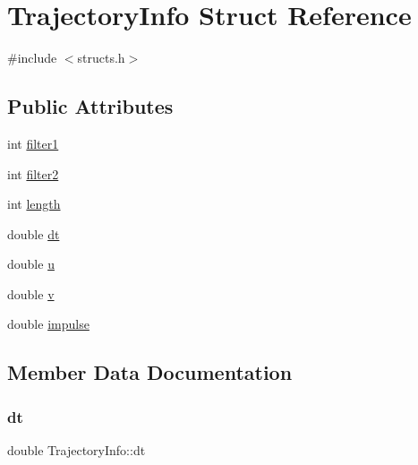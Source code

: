 \hypertarget{structTrajectoryInfo}{}\section{Trajectory\+Info Struct Reference}
\label{structTrajectoryInfo}


{\ttfamily \#include $<$structs.\+h$>$}

\subsection*{Public Attributes}
\begin{DoxyCompactItemize}
\item 
int \mbox{\hyperlink{structTrajectoryInfo_a3907115754a4a7bb5bcd5ed1fb16a807}{filter1}}
\item 
int \mbox{\hyperlink{structTrajectoryInfo_a87f28d62b2ff0cbfa6b960e6532f9716}{filter2}}
\item 
int \mbox{\hyperlink{structTrajectoryInfo_ad66c07d8466bd1436fc13adf7a4c0d00}{length}}
\item 
double \mbox{\hyperlink{structTrajectoryInfo_a407cf073bfe1a19acca8eaa7e4406dd0}{dt}}
\item 
double \mbox{\hyperlink{structTrajectoryInfo_ae8e71889e5d14c2e5973632ec8ed6249}{u}}
\item 
double \mbox{\hyperlink{structTrajectoryInfo_aa22fec1d85bb8b028fa000b54813edef}{v}}
\item 
double \mbox{\hyperlink{structTrajectoryInfo_abd4581d49bba19610a4bc11624cde5c3}{impulse}}
\end{DoxyCompactItemize}


\subsection{Member Data Documentation}
\mbox{\label{structTrajectoryInfo_a407cf073bfe1a19acca8eaa7e4406dd0}} 
\subsubsection{\texorpdfstring{dt}{dt}}
{\footnotesize\ttfamily double Trajectory\+Info\+::dt}

\mbox{\label{structTrajectoryInfo_a3907115754a4a7bb5bcd5ed1fb16a807}} 
